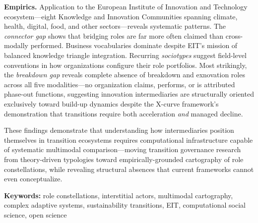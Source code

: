\documentclass[../main.tex]{subfiles}
\begin{document}
\textbf{Empirics.} Application to the European Institute of Innovation and Technology ecosystem---eight Knowledge and Innovation Communities spanning climate, health, digital, food, and other sectors---reveals systematic patterns. The \textit{connector gap} shows that bridging roles are far more often claimed than cross-modally performed. Business vocabularies dominate despite EIT's mission of balanced knowledge triangle integration. Recurring \textit{sociotypes} suggest field-level conventions in how organizations configure their role portfolios. Most strikingly, the \textit{breakdown gap} reveals complete absence of breakdown and exnovation roles across all five modalities---no organization claims, performs, or is attributed phase-out functions, suggesting innovation intermediaries are structurally oriented exclusively toward build-up dynamics despite the X-curve framework's demonstration that transitions require both acceleration \emph{and} managed decline.

These findings demonstrate that understanding how intermediaries position themselves in transition ecosystems requires computational infrastructure capable of systematic multimodal comparison---moving transition governance research from theory-driven typologies toward empirically-grounded cartography of role constellations, while revealing structural absences that current frameworks cannot even conceptualize.

\vspace{0.3cm}

\noindent\textbf{Keywords:} role constellations, interstitial actors, multimodal cartography, complex adaptive systems, sustainability transitions, EIT, computational social science, open science

\end{document}
